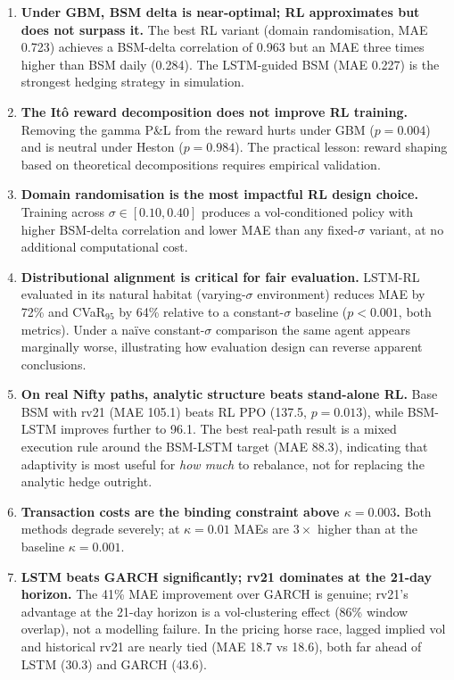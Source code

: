 \documentclass[12pt,a4paper]{article}
\begin{document}
\begin{enumerate}[leftmargin=*]
  \item \textbf{Under GBM, BSM delta is near-optimal; RL approximates but does
        not surpass it.}  The best RL variant (domain randomisation, MAE 0.723)
        achieves a BSM-delta correlation of 0.963 but an MAE three times higher
        than BSM daily (0.284).  The LSTM-guided BSM (MAE 0.227) is the
        strongest hedging strategy in simulation.

  \item \textbf{The It\^{o} reward decomposition does not improve RL training.}
        Removing the gamma P\&L from the reward hurts under GBM ($p=0.004$)
        and is neutral under Heston ($p=0.984$).  The practical lesson: reward
        shaping based on theoretical decompositions requires empirical
        validation.

  \item \textbf{Domain randomisation is the most impactful RL design choice.}
        Training across $\sigma\in[0.10,0.40]$ produces a vol-conditioned
        policy with higher BSM-delta correlation and lower MAE than any fixed-$\sigma$
        variant, at no additional computational cost.

  \item \textbf{Distributional alignment is critical for fair evaluation.}
        LSTM-RL evaluated in its natural habitat (varying-$\sigma$ environment)
        reduces MAE by 72\% and CVaR$_{95}$ by 64\% relative to a
        constant-$\sigma$ baseline ($p<0.001$, both metrics).  Under a
        na\"{i}ve constant-$\sigma$ comparison the same agent appears marginally
        worse, illustrating how evaluation design can reverse apparent conclusions.

  \item \textbf{On real Nifty paths, analytic structure beats stand-alone RL.}
        Base BSM with rv21 (MAE 105.1) beats RL PPO (137.5, $p=0.013$), while
        BSM-LSTM improves further to 96.1.  The best real-path result is a
        mixed execution rule around the BSM-LSTM target (MAE 88.3), indicating
        that adaptivity is most useful for \emph{how much} to rebalance, not
        for replacing the analytic hedge outright.

  \item \textbf{Transaction costs are the binding constraint above
        $\kappa = 0.003$.}  Both methods degrade severely; at $\kappa=0.01$
        MAEs are $3\times$ higher than at the baseline $\kappa=0.001$.

  \item \textbf{LSTM beats GARCH significantly; rv21 dominates at the 21-day
        horizon.}  The 41\% MAE improvement over GARCH is genuine; rv21's
        advantage at the 21-day horizon is a vol-clustering effect (86\%
        window overlap), not a modelling failure.  In the pricing horse race,
        lagged implied vol and historical rv21 are nearly tied (MAE 18.7 vs
        18.6), both far ahead of LSTM (30.3) and GARCH (43.6).
\end{enumerate}
\end{document}

